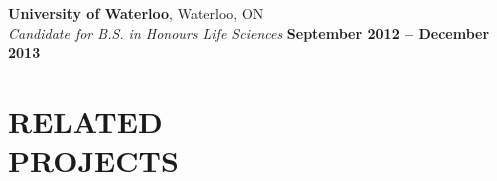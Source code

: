 \documentclass[margin,line]{resume}
\begin{document}
\begin{resume}
    \textbf{\listing University of Waterloo}, Waterloo, ON \vspace{2mm}\\\vspace{1mm}%
    \textsl{Candidate for B.S. in Honours Life Sciences} \hfill \textbf{ September 2012 -- December 2013}\vspace{-3mm}\\\vspace{-1mm}%

\sectionline\vspace{1mm}

    \section{\mysidestyle \textbf{\large{R}\small{ELATED\\PROJECTS}}} 
    

\end{resume}
\end{document}
